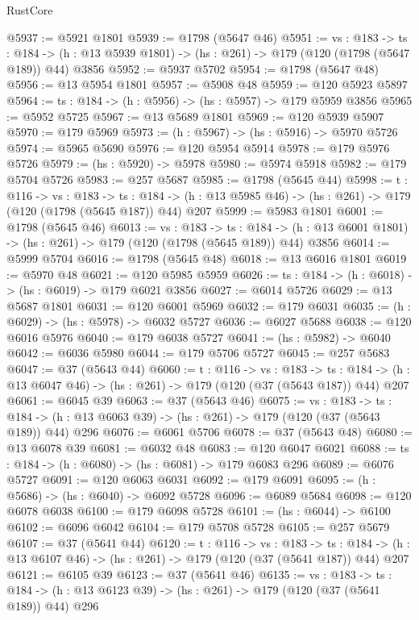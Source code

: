 \begin{lexlean}{RustCore}
\begin{coremodule}
@5937 := @5921 @1801
@5939 := @1798 (@5647 @46)
@5951 := {vs : @183} ->
  {ts : @184} -> (h : @13 @5939 @1801) -> (hs : @261) -> @179 (@120 (@1798 (@5647 @189)) @44) @3856
@5952 := @5937 @5702
@5954 := @1798 (@5647 @48)
@5956 := @13 @5954 @1801
@5957 := @5908 @48
@5959 := @120 @5923 @5897
@5964 := {ts : @184} -> (h : @5956) -> (hs : @5957) -> @179 @5959 @3856
@5965 := @5952 @5725
@5967 := @13 @5689 @1801
@5969 := @120 @5939 @5907
@5970 := @179 @5969
@5973 := (h : @5967) -> (hs : @5916) -> @5970 @5726
@5974 := @5965 @5690
@5976 := @120 @5954 @5914
@5978 := @179 @5976 @5726
@5979 := (hs : @5920) -> @5978
@5980 := @5974 @5918
@5982 := @179 @5704 @5726
@5983 := @257 @5687
@5985 := @1798 (@5645 @44)
@5998 := {t : @116} ->
  {vs : @183} ->
  {ts : @184} -> (h : @13 @5985 @46) -> (hs : @261) -> @179 (@120 (@1798 (@5645 @187)) @44) @207
@5999 := @5983 @1801
@6001 := @1798 (@5645 @46)
@6013 := {vs : @183} ->
  {ts : @184} -> (h : @13 @6001 @1801) -> (hs : @261) -> @179 (@120 (@1798 (@5645 @189)) @44) @3856
@6014 := @5999 @5704
@6016 := @1798 (@5645 @48)
@6018 := @13 @6016 @1801
@6019 := @5970 @48
@6021 := @120 @5985 @5959
@6026 := {ts : @184} -> (h : @6018) -> (hs : @6019) -> @179 @6021 @3856
@6027 := @6014 @5726
@6029 := @13 @5687 @1801
@6031 := @120 @6001 @5969
@6032 := @179 @6031
@6035 := (h : @6029) -> (hs : @5978) -> @6032 @5727
@6036 := @6027 @5688
@6038 := @120 @6016 @5976
@6040 := @179 @6038 @5727
@6041 := (hs : @5982) -> @6040
@6042 := @6036 @5980
@6044 := @179 @5706 @5727
@6045 := @257 @5683
@6047 := @37 (@5643 @44)
@6060 := {t : @116} ->
  {vs : @183} ->
  {ts : @184} -> (h : @13 @6047 @46) -> (hs : @261) -> @179 (@120 (@37 (@5643 @187)) @44) @207
@6061 := @6045 @39
@6063 := @37 (@5643 @46)
@6075 := {vs : @183} ->
  {ts : @184} -> (h : @13 @6063 @39) -> (hs : @261) -> @179 (@120 (@37 (@5643 @189)) @44) @296
@6076 := @6061 @5706
@6078 := @37 (@5643 @48)
@6080 := @13 @6078 @39
@6081 := @6032 @48
@6083 := @120 @6047 @6021
@6088 := {ts : @184} -> (h : @6080) -> (hs : @6081) -> @179 @6083 @296
@6089 := @6076 @5727
@6091 := @120 @6063 @6031
@6092 := @179 @6091
@6095 := (h : @5686) -> (hs : @6040) -> @6092 @5728
@6096 := @6089 @5684
@6098 := @120 @6078 @6038
@6100 := @179 @6098 @5728
@6101 := (hs : @6044) -> @6100
@6102 := @6096 @6042
@6104 := @179 @5708 @5728
@6105 := @257 @5679
@6107 := @37 (@5641 @44)
@6120 := {t : @116} ->
  {vs : @183} ->
  {ts : @184} -> (h : @13 @6107 @46) -> (hs : @261) -> @179 (@120 (@37 (@5641 @187)) @44) @207
@6121 := @6105 @39
@6123 := @37 (@5641 @46)
@6135 := {vs : @183} ->
  {ts : @184} -> (h : @13 @6123 @39) -> (hs : @261) -> @179 (@120 (@37 (@5641 @189)) @44) @296

\end{coremodule}
\end{lexlean}
